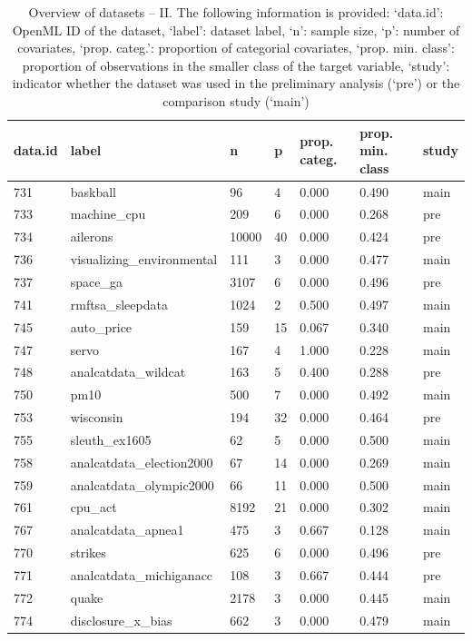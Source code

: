 \begin{table}[!htb]
\caption{Overview of datasets -- II. The following information is provided: `data.id': OpenML ID of the dataset, `label': dataset label, `n': sample size, `p': number of covariates, `prop. categ.': proportion of categorial covariates, `prop. min. class': proportion of observations in the smaller class of the target variable, `study': indicator whether the dataset was used in the preliminary analysis (`pre') or the comparison study (`main')}
\label{tab:data2}
\begin{tabular}{l | l | l | l | l | l | l}
data.id & label & n & p & prop. categ. & prop. min. class & study \\
\hline
731 & baskball & 96 & 4 & 0.000 & 0.490 & main \\
733 & machine\_cpu & 209 & 6 & 0.000 & 0.268 & pre \\
734 & ailerons & 10000 & 40 & 0.000 & 0.424 & pre \\
736 & visualizing\_environmental & 111 & 3 & 0.000 & 0.477 & main \\
737 & space\_ga & 3107 & 6 & 0.000 & 0.496 & pre \\
741 & rmftsa\_sleepdata & 1024 & 2 & 0.500 & 0.497 & main \\
745 & auto\_price & 159 & 15 & 0.067 & 0.340 & main \\
747 & servo & 167 & 4 & 1.000 & 0.228 & main \\
748 & analcatdata\_wildcat & 163 & 5 & 0.400 & 0.288 & pre \\
750 & pm10 & 500 & 7 & 0.000 & 0.492 & main \\
753 & wisconsin & 194 & 32 & 0.000 & 0.464 & pre \\
755 & sleuth\_ex1605 & 62 & 5 & 0.000 & 0.500 & main \\
758 & analcatdata\_election2000 & 67 & 14 & 0.000 & 0.269 & main \\
759 & analcatdata\_olympic2000 & 66 & 11 & 0.000 & 0.500 & main \\
761 & cpu\_act & 8192 & 21 & 0.000 & 0.302 & main \\
767 & analcatdata\_apnea1 & 475 & 3 & 0.667 & 0.128 & main \\
770 & strikes & 625 & 6 & 0.000 & 0.496 & pre \\
771 & analcatdata\_michiganacc & 108 & 3 & 0.667 & 0.444 & pre \\
772 & quake & 2178 & 3 & 0.000 & 0.445 & main \\
774 & disclosure\_x\_bias & 662 & 3 & 0.000 & 0.479 & main \\

\end{tabular}
\end{table}
